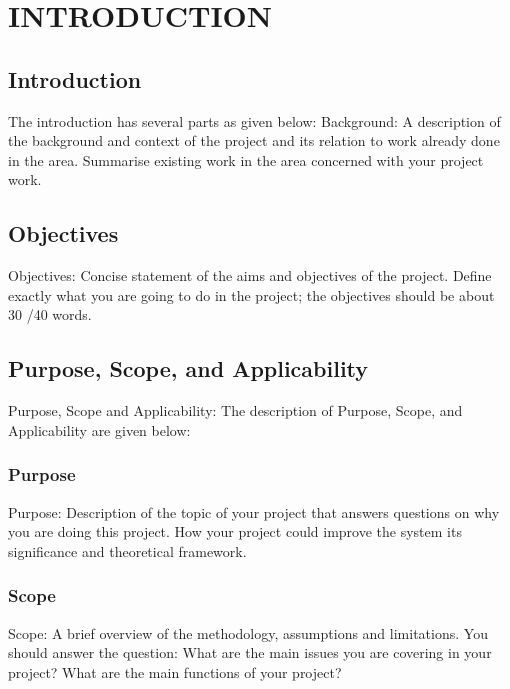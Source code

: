 
\chapter{INTRODUCTION} %

\label{Chapter1} %



\section{Introduction}
The introduction has several parts as given below:
Background: A description of the background and context of the project and its relation to work already done in the area. Summarise existing work in the area concerned with your project work.

\section{Objectives}
Objectives: Concise statement of the aims and objectives of the project. Define exactly what you are going to do in the project; the objectives should be about 30 /40 words.

\section{Purpose, Scope, and Applicability}
Purpose, Scope and Applicability: The description of Purpose, Scope, and Applicability are given below:

\subsection{Purpose}
Purpose: Description of the topic of your project that answers questions on why you are doing this project. How your project could improve the system its significance and theoretical framework.

\subsection{Scope}
Scope: A brief overview of the methodology, assumptions and limitations. You should answer the question: What are the main issues you are covering in your project? What are the main functions of your project?


